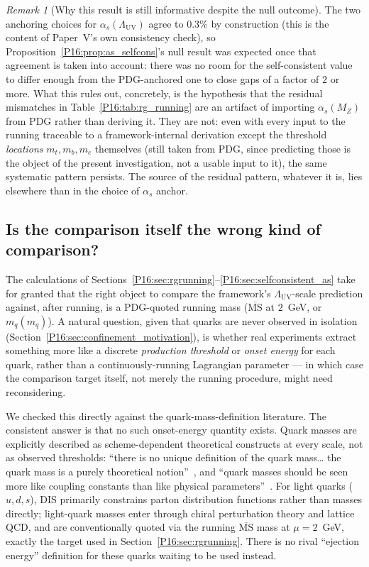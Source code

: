\documentclass[11pt,a4paper]{article}
\theoremstyle{definition}\newtheorem{definition}[theorem]{Definition}
\theoremstyle{remark}
\newtheorem{remark}[theorem]{Remark}
\theoremstyle{definition}\newtheorem{construction}[theorem]{Construction}
\newcommand{\LUV}{\Lambda_{\mathrm{UV}}}
\begin{document}
\begin{remark}[Why this result is still informative despite the null
  outcome]
\label{P16:rem:as_selfcons_informative}
The two anchoring choices for $\alpha_s(\LUV)$ agree to $0.3\%$ by
construction (this is the content of Paper~V's own consistency check),
so Proposition~\ref{P16:prop:as_selfcons}'s null result was expected once
that agreement is taken into account: there was no room for the
self-consistent value to differ enough from the PDG-anchored one to
close gaps of a factor of $2$ or more. What this rules out, concretely,
is the hypothesis that the residual mismatches in
Table~\ref{P16:tab:rg_running} are an artifact of importing $\alpha_s(M_Z)$
from PDG rather than deriving it. They are not: even with every input
to the running traceable to a framework-internal derivation except the
threshold \emph{locations} $m_t,m_b,m_c$ themselves (still taken from
PDG, since predicting those is the object of the present
investigation, not a usable input to it), the same systematic pattern
persists. The source of the residual pattern, whatever it is, lies
elsewhere than in the choice of $\alpha_s$ anchor.
\end{remark}

\subsection{Is the comparison itself the wrong kind of comparison?}
\label{P16:sec:comparison_target}

The calculations of Sections~\ref{P16:sec:rgrunning}--\ref{P16:sec:selfconsistent_as}
take for granted that the right object to compare the framework's
$\LUV$-scale prediction against, after running, is a PDG-quoted running
mass ($\overline{\mathrm{MS}}$ at $2$~GeV, or $m_q(m_q)$). A natural
question, given that quarks are never observed in isolation
(Section~\ref{P16:sec:confinement_motivation}), is whether real
experiments extract something more like a discrete
\emph{production threshold} or \emph{onset energy} for each quark,
rather than a continuously-running Lagrangian parameter --- in which
case the comparison target itself, not merely the running procedure,
might need reconsidering.

We checked this directly against the quark-mass-definition literature.
The consistent answer is that no such onset-energy quantity exists.
Quark masses are explicitly described as scheme-dependent
theoretical constructs at every scale, not as observed thresholds:
``there is no unique definition of the quark mass\dots{} the quark
mass is a purely theoretical notion''~\cite{Hoang1999,Hoang2002}, and ``quark
masses should be seen more like coupling constants than like physical
parameters''~\cite{Rodrigo1997}. For light quarks ($u,d,s$), DIS
primarily constrains parton distribution functions rather than masses
directly; light-quark masses enter through chiral perturbation theory
and lattice QCD, and are conventionally quoted via the running
$\overline{\mathrm{MS}}$ mass at $\mu=2$~GeV, exactly the target used
in Section~\ref{P16:sec:rgrunning}. There is no rival ``ejection energy''
definition for these quarks waiting to be used instead.
\end{document}
